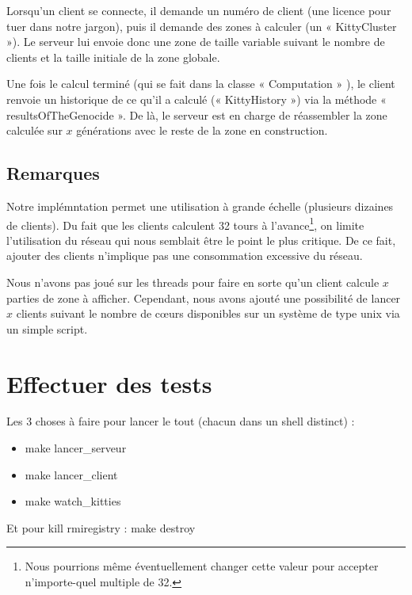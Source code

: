 \documentclass[twoside]{article}
\begin{document}
Lorsqu'un client se connecte, il demande un numéro de client (une licence pour tuer dans notre jargon), puis il demande des zones à calculer (un « KittyCluster »).
Le serveur lui envoie donc une zone de taille variable suivant le nombre de clients et la taille initiale de la zone globale.

Une fois le calcul terminé (qui se fait dans la classe « Computation » ), le client renvoie un historique de ce qu'il a calculé (« KittyHistory ») via la méthode « resultsOfTheGenocide ».
De là, le serveur est en charge de réassembler la zone calculée sur $x$ générations avec le reste de la zone en construction.

\subsection{Remarques}
Notre implémntation permet une utilisation à grande échelle (plusieurs dizaines de clients).
Du fait que les clients calculent 32 tours à l'avance\protect\footnote{
	Nous pourrions même éventuellement changer cette valeur pour accepter n'importe-quel multiple de 32.
}, on limite l'utilisation du réseau qui nous semblait être le point le plus critique.
De ce fait, ajouter des clients n'implique pas une consommation excessive du réseau.

Nous n'avons pas joué sur les threads pour faire en sorte qu'un client calcule $x$ parties de zone à afficher.
Cependant, nous avons ajouté une possibilité de lancer $x$ clients suivant le nombre de cœurs disponibles sur un système de type unix via un simple script.

\section{Effectuer des tests}
Les 3 choses à faire pour lancer le tout (chacun dans un shell distinct) :
\begin{itemize}
	\item make lancer\_serveur
	\item make lancer\_client
	\item make watch\_kitties
\end{itemize}
Et pour kill rmiregistry :
	make destroy


\end{document}
